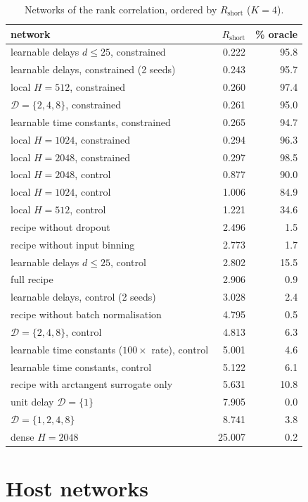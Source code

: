 \documentclass{iopjournal}
\begin{document}
\begin{table}
\caption{\label{s_tab:rel}Networks of the rank correlation, ordered by $R_{\mathrm{short}}$ ($K=4$).}
\centering
\begin{tabular}{lrr}
\hline
network & $R_{\mathrm{short}}$ & \% oracle \\
\hline
learnable delays $d\le25$, constrained & 0.222 & 95.8 \\
learnable delays, constrained (2 seeds) & 0.243 & 95.7 \\
local $H=512$, constrained & 0.260 & 97.4 \\
$\mathcal{D}=\{2,4,8\}$, constrained & 0.261 & 95.0 \\
learnable time constants, constrained & 0.265 & 94.7 \\
local $H=1024$, constrained & 0.294 & 96.3 \\
local $H=2048$, constrained & 0.297 & 98.5 \\
local $H=2048$, control & 0.877 & 90.0 \\
local $H=1024$, control & 1.006 & 84.9 \\
local $H=512$, control & 1.221 & 34.6 \\
recipe without dropout & 2.496 & 1.5 \\
recipe without input binning & 2.773 & 1.7 \\
learnable delays $d\le25$, control & 2.802 & 15.5 \\
full recipe & 2.906 & 0.9 \\
learnable delays, control (2 seeds) & 3.028 & 2.4 \\
recipe without batch normalisation & 4.795 & 0.5 \\
$\mathcal{D}=\{2,4,8\}$, control & 4.813 & 6.3 \\
learnable time constants ($100\times$ rate), control & 5.001 & 4.6 \\
learnable time constants, control & 5.122 & 6.1 \\
recipe with arctangent surrogate only & 5.631 & 10.8 \\
unit delay $\mathcal{D}=\{1\}$ & 7.905 & 0.0 \\
$\mathcal{D}=\{1,2,4,8\}$ & 8.741 & 3.8 \\
dense $H=2048$ & 25.007 & 0.2 \\
\hline
\end{tabular}
\end{table}

\section{Host networks}
\end{document}
